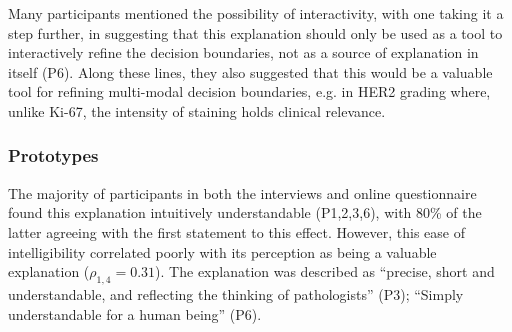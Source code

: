 Many participants mentioned the possibility of interactivity, with one taking it a step further, in suggesting that this explanation should only be used as a tool to interactively refine the decision boundaries, not as a source of explanation in itself (P6). Along these lines, they also suggested that this would be a valuable tool for refining multi-modal decision boundaries, e.g. in HER2 grading where, unlike Ki-67, the intensity of staining holds clinical relevance.



\subsubsection{Prototypes}


The majority of participants in both the interviews and online questionnaire found this explanation intuitively understandable (P1,2,3,6), with 80\% of the latter agreeing with the first statement to this effect. However, this ease of intelligibility correlated poorly with its perception as being a valuable explanation (\(\rho_{1,4} = 0.31\)). The explanation was described as “precise, short and understandable, and reflecting the thinking of pathologists” (P3); “Simply understandable for a human being” (P6).



